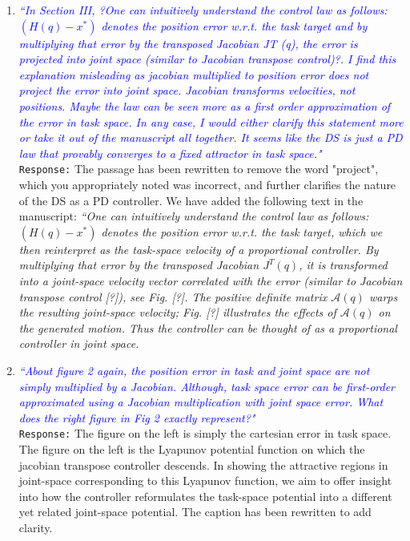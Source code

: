 \documentclass{article}
\begin{document}
\begin{enumerate}
\item \textcolor{blue}{\textit{``In Section III, ?One can intuitively understand the control law as follows:$(H(q) - x^*)$ denotes the
position error w.r.t. the task target and by multiplying that error by the transposed Jacobian JT (q),
the error is projected into joint space (similar to Jacobian transpose control)?. I find this explanation
misleading as jacobian multiplied to position error does not project the error into joint space. Jacobian
transforms velocities, not positions. Maybe the law can be seen more as a first order approximation
of the error in task space. In any case, I would either clarify this statement more or take it out of the
manuscript all together. It seems like the DS is just a PD law that provably converges to a fixed attractor
in task space."}}\\
\texttt{Response:} \small The passage has been rewritten to remove the word "project", which you appropriately noted was incorrect, and further clarifies the nature of the DS as a PD controller. We have added the following text in the manuscript: 
\textit{``One can intuitively understand the control law as follows: $(H(q) - x^*)$ denotes the position error w.r.t. the task target, which we then reinterpret as the task-space velocity of a proportional controller. By multiplying that error by the transposed Jacobian $J^T(q)$, it is transformed into a joint-space velocity vector correlated with the error (similar to Jacobian transpose control [?]), see Fig. [?]. The positive definite matrix $\mathcal{A}(q)$ warps the resulting joint-space velocity; Fig. [?] illustrates the effects of  $\mathcal{A}(q)$ on the generated motion. Thus the controller can be thought of as a proportional controller in joint space.}\\

\item \textcolor{blue}{\textit{``About figure 2 again, the position error in task and joint space are not simply multiplied by a Jacobian.
Although, task space error can be first-order approximated using a Jacobian multiplication with
joint space error. What does the right figure in Fig 2 exactly represent?"}}\\
\texttt{Response:} \small The figure on the left is simply the cartesian error in task space. The figure on the left is the Lyapunov potential function on which the jacobian transpose controller descends. In showing the attractive regions in joint-space corresponding to this Lyapunov function, we aim to offer insight into how the controller reformulates the task-space potential into a different yet related joint-space potential. The caption has been rewritten to add clarity.\\


\end{enumerate}
\end{document}
